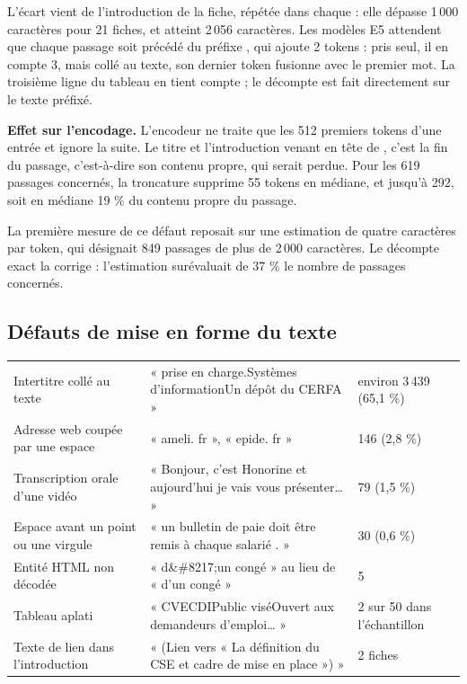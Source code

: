 L'écart vient de l'introduction de la fiche, répétée dans chaque  : elle dépasse
1\,000 caractères pour 21 fiches, et atteint 2\,056 caractères. Les modèles E5 attendent que chaque
passage soit précédé du préfixe , qui ajoute 2 tokens : pris seul, il en compte 3, mais
collé au texte, son dernier token fusionne avec le premier mot. La troisième ligne du tableau en tient
compte ; le décompte est fait directement sur le texte préfixé.

\textbf{Effet sur l'encodage.} L'encodeur  ne traite que les 512 premiers
tokens d'une entrée et ignore la suite. Le titre et l'introduction venant en tête de ,
c'est la fin du passage, c'est-à-dire son contenu propre, qui serait perdue. Pour les 619 passages
concernés, la troncature supprime 55 tokens en médiane, et jusqu'à 292, soit en médiane 19 \% du
contenu propre du passage.

La première mesure de ce défaut reposait sur une estimation de quatre caractères par token, qui
désignait 849 passages de plus de 2\,000 caractères. Le décompte exact la corrige : l'estimation
surévaluait de 37 \% le nombre de passages concernés.

\subsection{Défauts de mise en forme du texte}

\begin{tabletype}
\begin{tabularx}{\textwidth}{@{}L{4.4cm}Y L{2.6cm}@{}}
\toprule
{} &  &  \\
\midrule
Intertitre collé au texte & « prise en charge.Systèmes d'informationUn dépôt du CERFA » & environ 3\,439 (65,1 \%) \\
Adresse web coupée par une espace & « ameli. fr », « epide. fr » & 146 (2,8 \%) \\
Transcription orale d'une vidéo & « Bonjour, c'est Honorine et aujourd'hui je vais vous présenter\dots{} » & 79 (1,5 \%) \\
Espace avant un point ou une virgule & « un bulletin de paie doit être remis à chaque salarié . » & 30 (0,6 \%) \\
Entité HTML non décodée & « d\&\#8217;un congé » au lieu de « d'un congé » & 5 \\
Tableau aplati & « CVECDIPublic viséOuvert aux demandeurs d'emploi\dots{} » & 2 sur 50 dans l'échantillon \\
Texte de lien dans l'introduction & « (Lien vers « La définition du CSE et cadre de mise en place ») » & 2 fiches \\
\bottomrule
\end{tabularx}
\end{tabletype}

